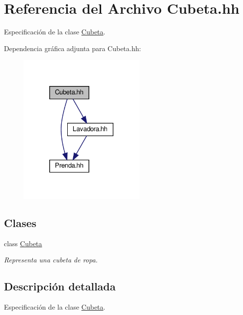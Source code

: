\hypertarget{_cubeta_8hh}{}\section{Referencia del Archivo Cubeta.\+hh}
\label{_cubeta_8hh}


Especificación de la clase \mbox{\hyperlink{class_cubeta}{Cubeta}}.  


Dependencia gráfica adjunta para Cubeta.\+hh\+:\nopagebreak
\begin{figure}[H]
\begin{center}
\leavevmode
\includegraphics[width=177pt]{_cubeta_8hh__incl}
\end{center}
\end{figure}
\subsection*{Clases}
\begin{DoxyCompactItemize}
\item 
class \mbox{\hyperlink{class_cubeta}{Cubeta}}
\begin{DoxyCompactList}\small\item\em Representa una cubeta de ropa. \end{DoxyCompactList}\end{DoxyCompactItemize}


\subsection{Descripción detallada}
Especificación de la clase \mbox{\hyperlink{class_cubeta}{Cubeta}}. 

